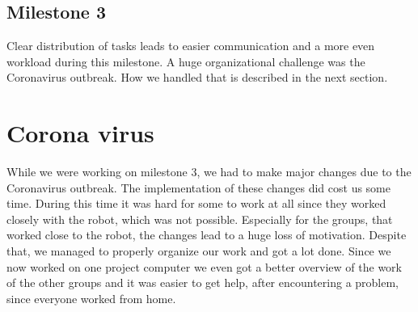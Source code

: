 \documentclass[main.tex]{subfiles}
\begin{document}
		\subsection{Milestone 3}
		Clear distribution of tasks leads to easier communication and a more even workload during this milestone.
		A huge organizational challenge was the Coronavirus outbreak. How we handled that is described in the next section. 
		
		\section{Corona virus}
	  	While we were working on milestone 3, we had to make major changes due to the Coronavirus outbreak. The implementation of these changes did cost us some time. During this time it was hard for some to work at all since they worked closely with the robot, which was not possible.
	  	Especially for the groups, that worked close to the robot, the changes lead to a huge loss of motivation.
	  	Despite that, we managed to properly organize our work and got a lot done.
	  	Since we now worked on one project computer we even got a better overview of the work of the other groups and it was easier to get help, after encountering a problem, since everyone worked from home.

	\endgroup
\end{document}
